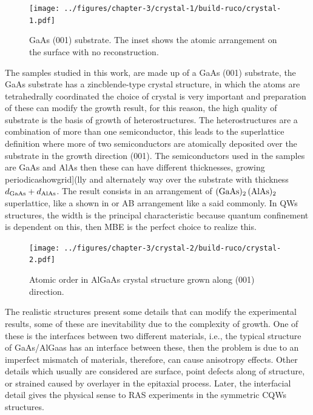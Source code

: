 \begin{figure}[H]
	\centering
	\texttt{[image: ../figures/chapter-3/crystal-1/build-ruco/crystal-1.pdf]}
	\caption[GaAs substrate growth direction]{GaAs (001) substrate. The inset shows the atomic arrangement on the surface with no reconstruction.}
	\label{fig:chapter-3 GaAs Substrate}
\end{figure}

The samples studied in this work, are made up of a GaAs (001) substrate, the GaAs substrate has a zincblende-type crystal structure, in which the atoms are tetrahedrally coordinated  the choice of crystal is very important and preparation of these can modify the growth result, for this reason, the high quality of substrate is the basis of growth of heterostructures. The heterostructures are a combination of more than one semiconductor, this leads to the superlattice definition where more of two semiconductors are atomically deposited over the substrate in the growth direction (001).  The semiconductors used in the samples are GaAs and AlAs then these can have different thicknesses, growing periodicashowgrid](lly and alternately way over the substrate with thickness $d_{\displaystyle\text{\scriptsize GaAs}}+d_{\displaystyle\text{\scriptsize AlAs}}$. The result consists in an arrangement of $(\displaystyle\text{\normalfont GaAs})_{2}\,(\displaystyle\text{\normalfont AlAs})_{2}$ superlattice,  like a  shown in   or AB arrangement like a said commonly. In QWs structures, the width is the principal characteristic because quantum confinement is dependent on this, then MBE is the perfect choice to realize this.  


\begin{figure}[H]
	\centering
	\texttt{[image: ../figures/chapter-3/crystal-2/build-ruco/crystal-2.pdf]}
	\caption[AlGaAs superlattice]{Atomic order in AlGaAs crystal structure grown  along (001) direction. }
	\label{fig:chapter-3 AlGaAs Cell}
\end{figure}

The realistic structures present some details that can modify the experimental results, some of these are inevitability due to the complexity of growth. One of these is the interfaces between two different materials, i.e., the typical structure of GaAs/AlGaas has an interface between these, then the problem is due to an imperfect mismatch of materials, therefore, can cause anisotropy effects. Other details which usually are considered are surface, point defects along of structure, or strained caused by overlayer in the epitaxial process.  Later, the interfacial detail gives the physical sense to RAS experiments in the symmetric CQWs structures. 


